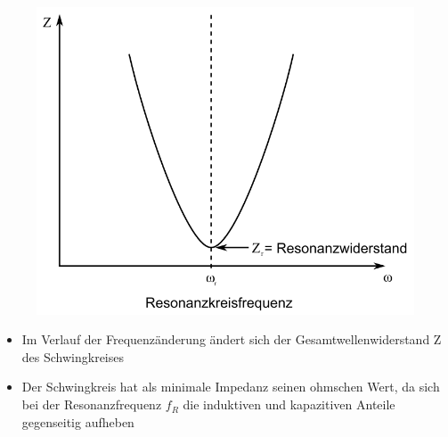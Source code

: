\begin{frame}
\begin{center}
\begin{minipage}{0.49\textwidth}
\begin{figure}
        \includegraphics[height=.45\textheight,width=\textwidth,keepaspectratio]{a04/SerirenschwSig.png}
      \end{figure}
    \end{minipage}
  \end{center}
  \begin{itemize}
    \item Im Verlauf der Frequenzänderung ändert sich der Gesamtwellenwiderstand Z des Schwingkreises
    \item Der Schwingkreis hat als minimale Impedanz seinen ohmschen Wert, da sich bei der Resonanzfrequenz $f_R$ die induktiven und kapazitiven Anteile gegenseitig aufheben
  \end{itemize}
\end{frame}

